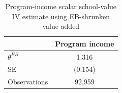 \begin{table}[!htbp]
\centering
\caption{Program-income scalar school-value IV estimate using EB-shrunken value added}
\label{tab:scalar_school_value_iv_program_income_expected_va_eb}
\begin{tabular}{lc}
\toprule
 & Program income \\
\midrule
$\theta^{EB}$ & 1.316 \\
SE & (0.154) \\
Observations & 92,959 \\
\bottomrule
\end{tabular}
\end{table}
